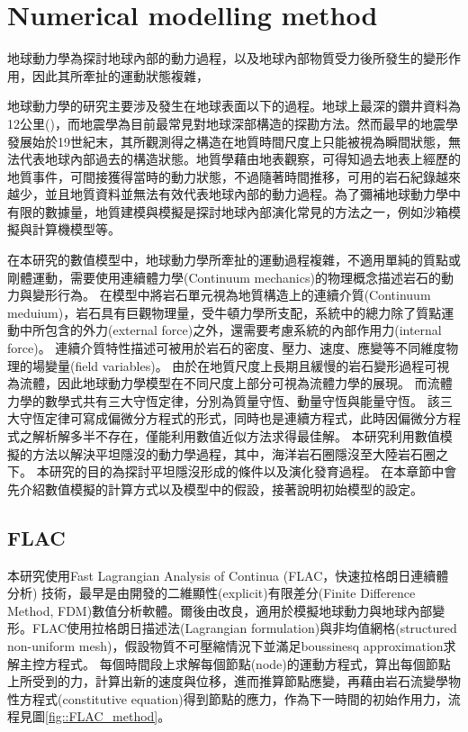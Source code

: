 
\chapter{Numerical modelling method}


地球動力學為探討地球內部的動力過程，以及地球內部物質受力後所發生的變形作用，因此其所牽扯的運動狀態複雜，


地球動力學的研究主要涉及發生在地球表面以下的過程。地球上最深的鑽井資料為12公里(\citealp{ganchin1998seismic})，而地震學為目前最常見對地球深部構造的探勘方法。然而最早的地震學發展始於19世紀末，其所觀測得之構造在地質時間尺度上只能被視為瞬間狀態，無法代表地球內部過去的構造狀態。地質學藉由地表觀察，可得知過去地表上經歷的地質事件，可間接獲得當時的動力狀態，不過隨著時間推移，可用的岩石紀錄越來越少，並且地質資料並無法有效代表地球內部的動力過程。為了彌補地球動力學中有限的數據量，地質建模與模擬是探討地球內部演化常見的方法之一，例如沙箱模擬與計算機模型等。


在本研究的數值模型中，地球動力學所牽扯的運動過程複雜，不適用單純的質點或剛體運動，需要使用連續體力學(Continuum mechanics)的物理概念描述岩石的動力與變形行為。
在模型中將岩石單元視為地質構造上的連續介質(Continuum meduium)，岩石具有巨觀物理量，受牛頓力學所支配，系統中的總力除了質點運動中所包含的外力(external force)之外，還需要考慮系統的內部作用力(internal force)。
連續介質特性描述可被用於岩石的密度、壓力、速度、應變等不同維度物理的場變量(field variables)。
由於在地質尺度上長期且緩慢的岩石變形過程可視為流體，因此地球動力學模型在不同尺度上部分可視為流體力學的展現。
而流體力學的數學式共有三大守恆定律，分別為質量守恆、動量守恆與能量守恆。
該三大守恆定律可寫成偏微分方程式的形式，同時也是連續方程式，此時因偏微分方程式之解析解多半不存在，僅能利用數值近似方法求得最佳解。
本研究利用數值模擬的方法以解決平坦隱沒的動力學過程，其中，海洋岩石圈隱沒至大陸岩石圈之下。
本研究的目的為探討平坦隱沒形成的條件以及演化發育過程。
在本章節中會先介紹數值模擬的計算方式以及模型中的假設，接著說明初始模型的設定。

\section{FLAC}

本研究使用Fast Lagrangian Analysis of Continua (FLAC，快速拉格朗日連續體分析) 技術，最早是由\citealp{cundall1989numerical}開發的二維顯性(explicit)有限差分(Finite Difference Method, FDM)數值分析軟體。爾後由\citealp{Lavier2000}改良，適用於模擬地球動力與地球內部變形。FLAC使用拉格朗日描述法(Lagrangian formulation)與非均值網格(structured non-uniform mesh)，假設物質不可壓縮情況下並滿足boussinesq approximation求解主控方程式。
每個時間段上求解每個節點(node)的運動方程式，算出每個節點上所受到的力，計算出新的速度與位移，進而推算節點應變，再藉由岩石流變學物性方程式(constitutive equation)得到節點的應力，作為下一時間的初始作用力，流程見圖\ref{fig::FLAC_method}。

